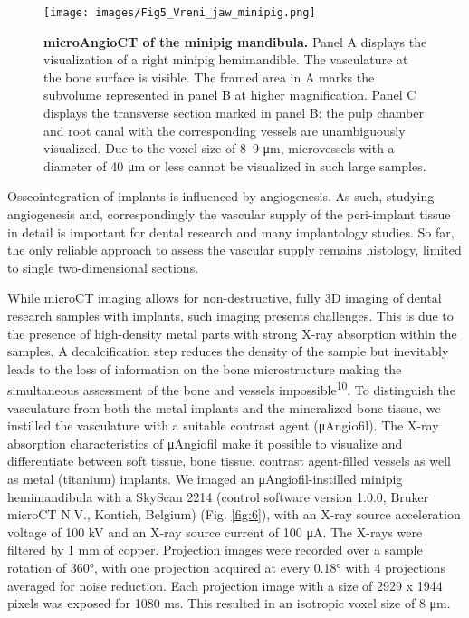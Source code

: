 \begin{figure}
\hypertarget{fig:5}{%
\centering
\texttt{[image: images/Fig5\_Vreni\_jaw\_minipig.png]}
\caption{\textbf{microAngioCT of the minipig mandibula.}
Panel A displays the visualization of a right minipig hemimandible.
The vasculature at the bone surface is visible.
The framed area in A marks the subvolume represented in panel B at higher magnification.
Panel C displays the transverse section marked in panel B: the pulp chamber and root canal with the corresponding vessels are unambiguously visualized.
Due to the voxel size of 8--9 μm, microvessels with a diameter of 40 μm or less cannot be visualized in such large samples.}\label{fig:5}
}
\end{figure}

Osseointegration of implants is influenced by angiogenesis.
As such, studying angiogenesis and, correspondingly the vascular supply of the peri-implant tissue in detail is important for dental research and many implantology studies.
So far, the only reliable approach to assess the vascular supply remains histology, limited to single two-dimensional sections.

While microCT imaging allows for non-destructive, fully 3D imaging of dental research samples with implants, such imaging presents challenges.
This is due to the presence of high-density metal parts with strong X-ray absorption within the samples.
A decalcification step reduces the density of the sample but inevitably leads to the loss of information on the bone microstructure making the simultaneous assessment of the bone and vessels impossible\textsuperscript{\protect\hyperlink{ref-117R9ULnv}{10}}.
To distinguish the vasculature from both the metal implants and the mineralized bone tissue, we instilled the vasculature with a suitable contrast agent (μAngiofil).
The X-ray absorption characteristics of μAngiofil make it possible to visualize and differentiate between soft tissue, bone tissue, contrast agent-filled vessels as well as metal (titanium) implants.
We imaged an μAngiofil-instilled minipig hemimandibula with a SkyScan 2214 (control software version 1.0.0, Bruker microCT N.V., Kontich, Belgium) (Fig. \ref{fig:6}), with an X-ray source acceleration voltage of 100 kV and an X-ray source current of 100 μA.
The X-rays were filtered by 1 mm of copper.
Projection images were recorded over a sample rotation of 360°, with one projection acquired at every 0.18° with 4 projections averaged for noise reduction.
Each projection image with a size of 2929 x 1944 pixels was exposed for 1080 ms.
This resulted in an isotropic voxel size of 8 μm.

